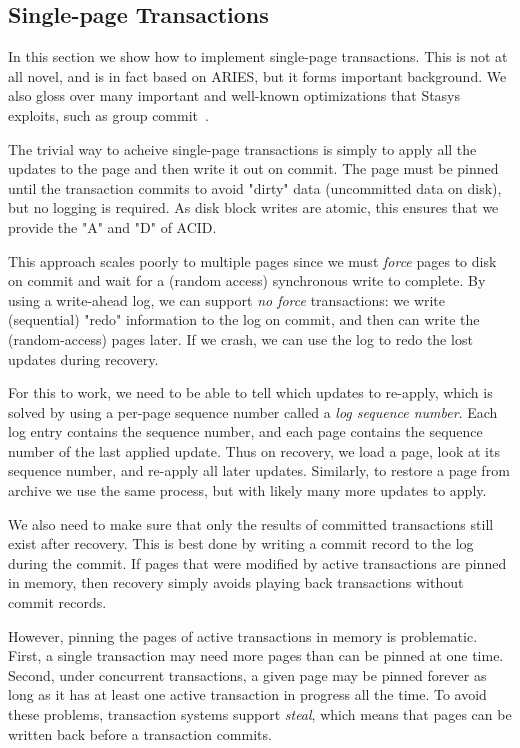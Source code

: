\documentclass[letterpaper,twocolumn,10pt]{article}
\newcommand{\yad}{Stasys\xspace}
\begin{document}
\subsection{Single-page Transactions}

In this section we show how to implement single-page transactions.
This is not at all novel, and is in fact based on ARIES, but it forms
important background.  We also gloss over many important and
well-known optimizations that \yad exploits, such as group
commit~\cite{group-commit}.

The trivial way to acheive single-page transactions is simply to apply
all the updates to the page and then write it out on commit. The page
must be pinned until the transaction commits to avoid "dirty" data
(uncommitted data on disk), but no logging is required.  As disk
block writes are atomic, this ensures that we provide the "A" and "D"
of ACID.

This approach scales poorly to multiple pages since we must {\em force} pages to disk
on commit and wait for a (random access) synchronous write to
complete. By using a write-ahead log, we can support {\em no force}
transactions: we write (sequential) "redo" information to the log on commit, and
then can write the (random-access) pages later. If we crash, we can use the log to
redo the lost updates during recovery.

For this to work, we need to be able to tell which updates to
re-apply, which is solved by using a per-page sequence number called a
{\em log sequence number}. Each log entry contains the sequence
number, and each page contains the sequence number of the last applied
update.  Thus on recovery, we load a page, look at its sequence
number, and re-apply all later updates.  Similarly, to restore a page
from archive we use the same process, but with likely many more
updates to apply.

We also need to make sure that only the results of committed
transactions still exist after recovery.  This is best done by writing
a commit record to the log during the commit.  If pages that were
modified by active transactions are pinned in memory, then recovery
simply avoids playing back transactions without commit records.

However, pinning the pages of active transactions in memory is problematic.
First, a single transaction may need more pages than can be pinned at
one time. Second, under concurrent transactions, a given page may be
pinned forever as long as it has at least one active transaction in
progress all the time.  To avoid these problems, transaction systems
support {\em steal}, which means that pages can be written back
before a transaction commits. 
\end{document}

